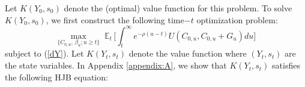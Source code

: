 \documentclass[12pt]{article}
\newcommand{\NW}[1]{{\textcolor{blue}{#1}}}
\newcommand{\WJ}[1]{{\textcolor{red}{#1}}}
\begin{document}
Let $K(Y_0, s_0)$ denote the (optimal) value function for this problem. To solve $K(Y_0, s_0)$, we first construct the following time$-t$ optimization problem: %
\begin{equation}\label{Vcontinue1}
\max_{\{C_{0, u}, \, \beta_u; u\geq t \}}\; 
\mathbb{E}_t	\, \bigg[\int_t^{\infty} e^{-\rho(u-t)} U({C}_{0, u}, {C}_{0, u}+G_u) d u \bigg] \,  
\end{equation}
subject to (\ref{dY}).
Let $K(Y_t, s_t)$ denote the value function where $(Y_t, s_t)$ are the state variables. 
%
{In Appendix \ref{appendix:A}}, we show that $K(Y_t, s_t)$ satisfies the following HJB equation: 
\end{document}

